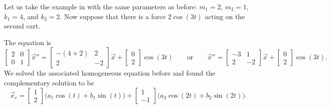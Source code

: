 \begin{example}
Let us take the example in  with
the same parameters as before:
$m_1 = 2$, $m_2 = 1$, $k_1 = 4$, and $k_2 = 2$.  Now suppose that
there is a force $2 \cos (3t)$ acting on the second cart.

The equation is
\begin{equation*}
\begin{bmatrix}
2 & 0 \\
0 & 1
\end{bmatrix}
{\vec{x}}'' =
\begin{bmatrix}
-(4+2) & 2 \\
2 & -2
\end{bmatrix}
\vec{x} 
+ 
\begin{bmatrix}
0 \\ 2
\end{bmatrix}
\cos (3 t) \qquad \text{or} \qquad
{\vec{x}}'' =
\begin{bmatrix}
-3 & 1 \\
2 & -2
\end{bmatrix}
\vec{x} 
+ 
\begin{bmatrix}
0 \\ 2
\end{bmatrix}
\cos (3 t) .
\end{equation*}
We solved the associated homogeneous equation before and found the
complementary solution to be
\begin{equation*}
\vec{x}_c =
\begin{bmatrix} 1 \\ 2 \end{bmatrix}
\bigl( a_1 \cos (t) + b_1 \sin (t) \bigr)
+
\begin{bmatrix} 1 \\ -1 \end{bmatrix}
\bigl( a_2 \cos (2t) + b_2 \sin (2t) \bigr) .
\end{equation*}


\end{example}
